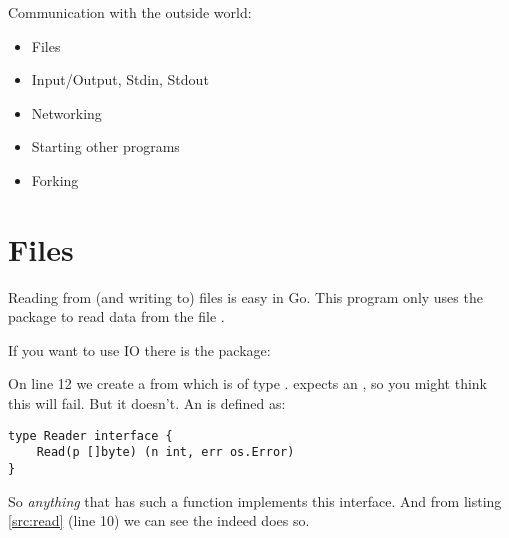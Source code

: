 Communication with the outside world:
\begin{itemize}
\item{Files}
\item{Input/Output, Stdin, Stdout}
\item{Networking}
\item{Starting other programs}
\item{Forking}
\end{itemize}

\section{Files}
Reading from (and writing to) files is easy in Go. This program
only uses the  package to read data from the file .

If you want to use  IO there is the  package:

On line 12 we create a  from  which is of
type .  expects an , so you
might think this will fail. But it doesn't. An  is
defined as:
\begin{lstlisting}
type Reader interface {
    Read(p []byte) (n int, err os.Error)
}
\end{lstlisting}
So \emph{anything} that has such a  function implements this
interface. And from listing \ref{src:read} (line 10) we can see
the  indeed does so. 

